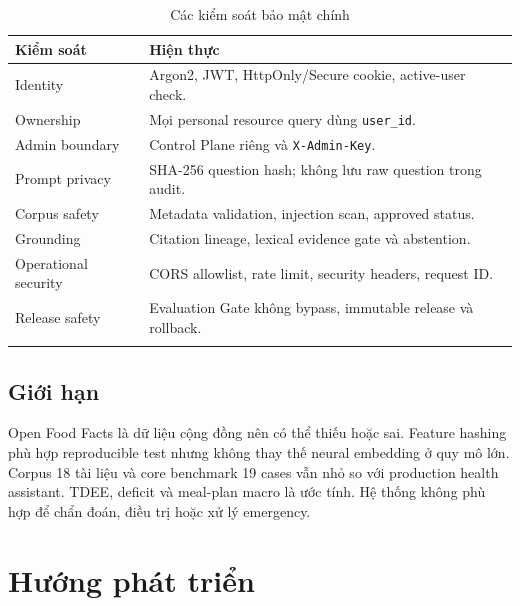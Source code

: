 \documentclass[12pt,a4paper]{report}
\newcommand{\code}[1]{\texttt{#1}}
\begin{document}
\begin{longtable}{p{}p{}}
\toprule
\textbf{Kiểm soát} & \textbf{Hiện thực}\\
\midrule
\endhead
Identity & Argon2, JWT, HttpOnly/Secure cookie, active-user check.\\
Ownership & Mọi personal resource query dùng \code{user\_id}.\\
Admin boundary & Control Plane riêng và \code{X-Admin-Key}.\\
Prompt privacy & SHA-256 question hash; không lưu raw question trong audit.\\
Corpus safety & Metadata validation, injection scan, approved status.\\
Grounding & Citation lineage, lexical evidence gate và abstention.\\
Operational security & CORS allowlist, rate limit, security headers, request ID.\\
Release safety & Evaluation Gate không bypass, immutable release và rollback.\\
\bottomrule
\caption{Các kiểm soát bảo mật chính}
\end{longtable}

\section{Giới hạn}

Open Food Facts là dữ liệu cộng đồng nên có thể thiếu hoặc sai. Feature hashing
phù hợp reproducible test nhưng không thay thế neural embedding ở quy mô lớn.
Corpus 18 tài liệu và core benchmark 19 cases vẫn nhỏ so với production health
assistant. TDEE, deficit và meal-plan macro là ước tính. Hệ thống không phù hợp
để chẩn đoán, điều trị hoặc xử lý emergency.

\chapter{Hướng phát triển}
\end{document}
